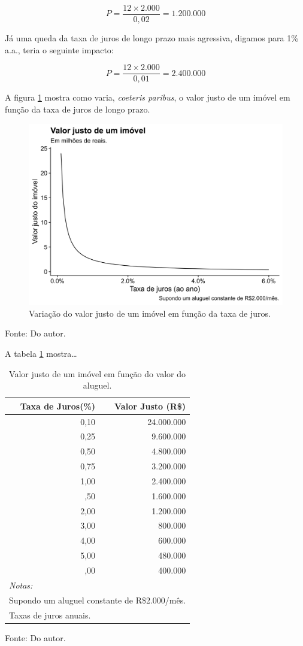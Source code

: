 \documentclass[
	12pt,				%
	oneside,			%
	a4paper,			%
	chapter=TITLE,		%
	section=TITLE,		%
	english,			%
	brazil				%
	]{abntex2}
\newcommand{\bcenter}{\begin{center}}
\newcommand{\ecenter}{\end{center}}
\begin{document}
\[P = \frac{12 \times 2.000}{0,02} = 1.200.000\]

Já uma queda da taxa de juros de longo prazo mais agressiva, digamos
para 1\% a.a., teria o seguinte impacto:

\[P = \frac{12 \times 2.000}{0,01} = 2.400.000\]

A figura \ref{fig:valores-juros} mostra como varia, \emph{coeteris
paribus}, o valor justo de um imóvel em função da taxa de juros de longo
prazo.
\begin{figure}[H]

{\centering \includegraphics[width=0.7\linewidth]{images/valores-juros-1} 

}

\caption{Variação do valor justo de um imóvel em função da taxa de juros.}\label{fig:valores-juros}
\end{figure}
\bcenter
Fonte: Do autor. \ecenter

A tabela \ref{tab:tabela-valor-justo} mostra\ldots{}
\begin{table}[H]

\caption{\label{tab:tabela-valor-justo}Valor justo de um imóvel em função do valor do aluguel.}
\centering
\begin{tabular}[t]{rr}
\toprule
Taxa de Juros(\%) & Valor Justo (R\$)\\
\midrule
0,10 & 24.000.000\\
0,25 & 9.600.000\\
0,50 & 4.800.000\\
0,75 & 3.200.000\\
1,00 & 2.400.000\\
\addlinespace
1,50 & 1.600.000\\
2,00 & 1.200.000\\
3,00 & 800.000\\
4,00 & 600.000\\
5,00 & 480.000\\
\addlinespace
6,00 & 400.000\\
\bottomrule
\multicolumn{2}{l}{\textit{Notas:}}\\
\multicolumn{2}{l}{Supondo um aluguel constante de R\$2.000/mês.}\\
\multicolumn{2}{l}{Taxas de juros anuais.}\\
\end{tabular}
\end{table}
\bcenter
Fonte: Do autor. \ecenter
\end{document}
